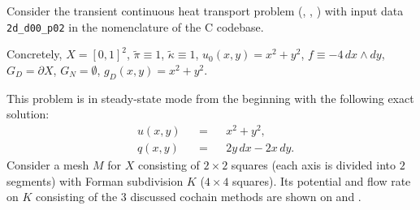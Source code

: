 \begin{example}
  \label{cmc/diffusion/continuous/transient/examples/2d_d00_p02-example}
  Consider the transient continuous heat transport problem
  (,
   ,
   )
  with input data \verb|2d_d00_p02| in the nomenclature of the C codebase.

  Concretely,
    $X = [0, 1]^2$,
    $\tilde{\pi} \equiv 1$,
    $\tilde{\kappa} \equiv 1$,
    $u_0(x, y) = x^2 + y^2$,
    $f \equiv - 4\, d x \wedge d y$,
    $G_D = \partial X$,
    $G_N = \emptyset$,
    $g_D(x, y) = x^2 + y^2$.

  This problem is in steady-state mode from the beginning
  with the following exact solution:
  \begin{subequations}
    \begin{alignat}{3}
      & u(x, y) && = && x^2 + y^2, \\
      & q(x, y) && = && 2 y\, d x - 2 x\, d y.
    \end{alignat}
  \end{subequations}
  Consider a mesh $M$ for $X$ consisting of $2 \times 2$ squares (each axis is
  divided into $2$ segments) with Forman subdivision $K$ ($4 \times 4$ squares).
  Its potential and flow rate on $K$ consisting of the $3$ discussed cochain
  methods are shown on
  and
  .
\end{example}
